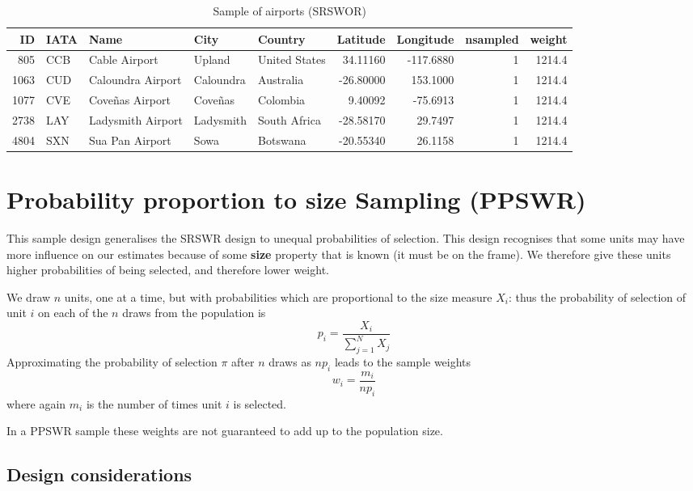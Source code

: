 \documentclass[
]{book}
\begin{document}
\begin{table}
\centering
\caption{\label{tab:unnamed-chunk-72}Sample of airports (SRSWOR)}
\centering
\begin{tabular}[t]{r|l|l|l|l|r|r|r|r}
\hline
ID & IATA & Name & City & Country & Latitude & Longitude & nsampled & weight\\
\hline
805 & CCB & Cable Airport & Upland & United States & 34.11160 & -117.6880 & 1 & 1214.4\\
\hline
1063 & CUD & Caloundra Airport & Caloundra & Australia & -26.80000 & 153.1000 & 1 & 1214.4\\
\hline
1077 & CVE & Coveñas Airport & Coveñas & Colombia & 9.40092 & -75.6913 & 1 & 1214.4\\
\hline
2738 & LAY & Ladysmith Airport & Ladysmith & South Africa & -28.58170 & 29.7497 & 1 & 1214.4\\
\hline
4804 & SXN & Sua Pan Airport & Sowa & Botswana & -20.55340 & 26.1158 & 1 & 1214.4\\
\hline
\end{tabular}
\end{table}

\section{Probability proportion to size Sampling (PPSWR)}\label{probability-proportion-to-size-sampling-ppswr}

This sample design generalises the SRSWR design to unequal probabilities of
selection. This design recognises that some units may have more influence on
our estimates because of some \textbf{size} property that is known (it must be on the
frame). We therefore give these units higher probabilities of being selected,
and therefore lower weight.

We draw \(n\) units, one at a time, but with probabilities which are proportional to
the size measure \(X_i\): thus the probability of selection of unit \(i\) on each
of the \(n\) draws from the population is
\[
   p_i = \frac{X_i}{\sum_{j=1}^N X_j}
\]
Approximating the probability of selection \(\pi\) after \(n\) draws as \(np_i\)
leads to the sample weights
\[
   w_i = \frac{m_i}{np_i}
\]
where again \(m_i\) is the number of times unit \(i\) is selected.

In a PPSWR sample these weights are not guaranteed to add up to the population size.

\subsection*{Design considerations}\label{design-considerations-3}
\end{document}
